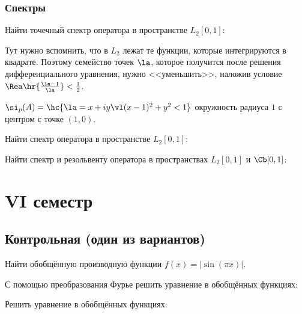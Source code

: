\documentclass[a4paper]{article}
\begin{document}
\subsubsection{Спектры}

\begin{problem}
Найти точечный спектр оператора в пространстве $L_2[0,1]$:
\end{problem}
\begin{hint}
Тут нужно вспомнить, что в $L_2$ лежат те функции, которые интегрируются в квадрате. Поэтому
семейство точек $\la$, которое получится после решения дифференциального уравнения, нужно
<<уменьшить>>, наложив условие $\Rea\hr{\frac{\la-1}{\la}} < \frac12$.
\end{hint}
\begin{answer}
$\si_p(A) = \hc{\la =x+iy \vl (x-1)^2+y^2 < 1}$ окружность радиуса $1$ с центром с точке $(1,0)$.
\end{answer}

\begin{problem}
Найти спектр оператора в пространстве $L_2[0,1]$:
\end{problem}

\begin{problem}
Найти спектр и резольвенту оператора в пространствах $L_2[0,1]$ и $\Cb[0,1]$:
\end{problem}

\section{VI семестр}

\subsection{Контрольная (один из вариантов)}

\begin{problem}
Найти обобщённую производную функции $f(x) = |\sin (\pi x)|$.
\end{problem}

\begin{problem}
С помощью преобразования Фурье решить уравнение в обобщённых функциях:
\end{problem}

\begin{problem}
Решить уравнение в обобщённых функциях:
\end{problem}
\end{document}
